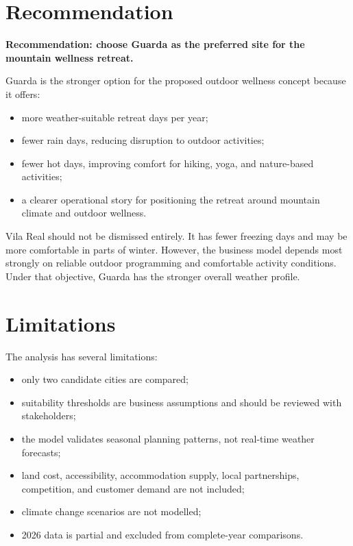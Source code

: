 \documentclass[11pt,a4paper]{article}
\begin{document}
\section{Recommendation}

\textbf{Recommendation: choose Guarda as the preferred site for the mountain wellness retreat.}

Guarda is the stronger option for the proposed outdoor wellness concept because it offers:

\begin{itemize}[leftmargin=*]
    \item more weather-suitable retreat days per year;
    \item fewer rain days, reducing disruption to outdoor activities;
    \item fewer hot days, improving comfort for hiking, yoga, and nature-based activities;
    \item a clearer operational story for positioning the retreat around mountain climate and outdoor wellness.
\end{itemize}

Vila Real should not be dismissed entirely. It has fewer freezing days and may be more comfortable in parts of winter. However, the business model depends most strongly on reliable outdoor programming and comfortable activity conditions. Under that objective, Guarda has the stronger overall weather profile.

\section{Limitations}

The analysis has several limitations:

\begin{itemize}[leftmargin=*]
    \item only two candidate cities are compared;
    \item suitability thresholds are business assumptions and should be reviewed with stakeholders;
    \item the model validates seasonal planning patterns, not real-time weather forecasts;
    \item land cost, accessibility, accommodation supply, local partnerships, competition, and customer demand are not included;
    \item climate change scenarios are not modelled;
    \item 2026 data is partial and excluded from complete-year comparisons.
\end{itemize}
\end{document}
